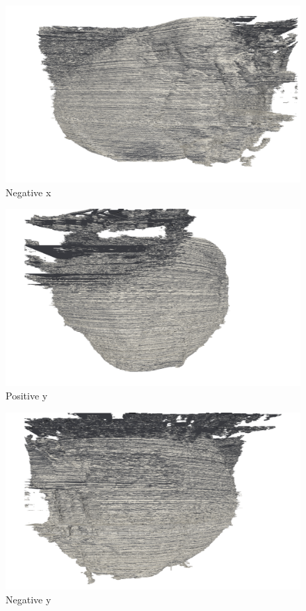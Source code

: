     \begin{figure}
      \centering
      \includegraphics[width=\textheight]{Ch6/Figs/Rat28/contours/LoRes_negative_x}
      \caption{Negative x}
      \label{fig:LoRes_negative_x}
    \end{figure}
    
    \begin{figure}
      \centering
      \includegraphics[width=\textheight]{Ch6/Figs/Rat28/contours/LoRes_positive_y}
      \caption{Positive y}
      \label{fig:LoRes_positive_y}
    \end{figure}
    
    \begin{figure}
      \centering
      \includegraphics[width=\textheight]{Ch6/Figs/Rat28/contours/LoRes_negative_y}
      \caption{Negative y}
      \label{fig:LoRes_negative_y}
    \end{figure}
    
